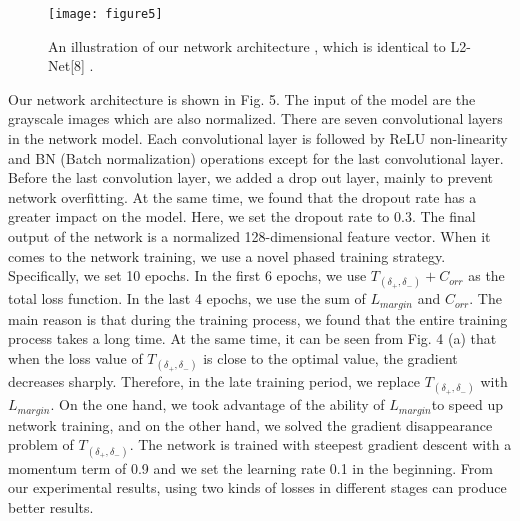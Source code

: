 \documentclass[letterpaper, 10 pt, conference]{ieeeconf}  %
\begin{document}
\begin{figure}[h]
\centering
\texttt{[image: figure5]}
\caption{An illustration of our  network architecture , which is identical to L2-Net[8] .}
\end{figure}

Our network architecture is shown in Fig. 5. The input of the model are the grayscale images which are also normalized. There are seven convolutional layers in the network model. Each convolutional layer is followed by ReLU non-linearity and BN (Batch normalization) operations except for the last convolutional layer. Before the last convolution layer, we added a drop out layer, mainly to prevent network overfitting. At the same time, we found that the dropout rate has a greater impact on the model. Here, we set the dropout rate to 0.3. The final output of the network is a normalized 128-dimensional feature vector.  
When it comes to the network training, we use a novel phased training strategy.  Specifically, we set 10 epochs. In the first 6 epochs, we use $T_{(\delta _{+},\delta _{-})} + C_{orr}$ as the total loss function. In the last 4 epochs, we use the sum of $L_{margin}$ and $C_{orr}$. The main reason is that during the training process, we found that the entire training process takes a long time. At the same time, it can be seen from Fig. 4 (a) that when the loss value of $T_{(\delta _{+},\delta _{-})}$  is close to the optimal value, the gradient decreases sharply. Therefore, in the late training period, we replace $T_{(\delta _{+},\delta _{-})}$ with $L_{margin}$. On the one hand, we took advantage of the  ability of $L_{margin}$to speed up network training, and on the other hand, we solved the gradient disappearance problem of  $T_{(\delta _{+},\delta _{-})}$. The network is trained with steepest gradient descent with a momentum term of 0.9 and we set the learning rate 0.1 in the beginning. From our experimental results, using two kinds of losses in different stages can produce better results.
\end{document}
